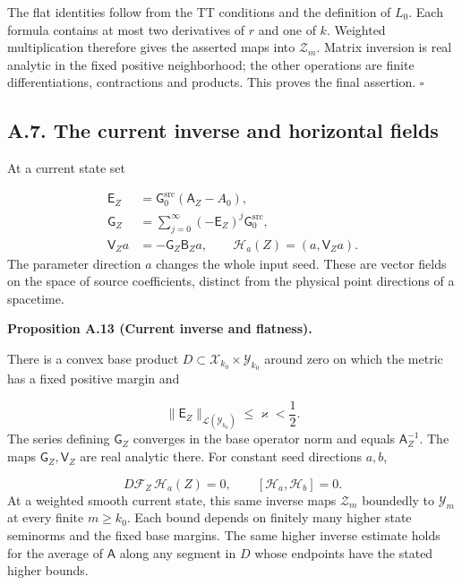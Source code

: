 \documentclass[
  english,
  11pt,
  reqno]{amsart}
\makeatletter
\newcommand{\pandocstatementheading}[1]{%
  \par\addpenalty{\@beginparpenalty}%
  \addvspace{.5\baselineskip plus .2\baselineskip minus .2\baselineskip}%
  {\normalfont\bfseries #1\par}%
  \nobreak\@afterindenttrue\@afterheading
}
\makeatother
\begin{document}
The flat identities follow from the TT conditions and the definition of
\(L_0\). Each formula contains at most two derivatives of \(r\) and one
of \(k\). Weighted multiplication therefore gives the asserted maps into
\(\mathcal Z_m\). Matrix inversion is real analytic in the fixed
positive neighborhood; the other operations are finite differentiations,
contractions and products. This proves the final assertion.
\hfill\(\square\)

\subsection{A.7. The current inverse and horizontal
fields}\label{a.7.-the-current-inverse-and-horizontal-fields}\label{sec:online-current-inverse-and-flatness}

At a current state set

\label{eq:online-current-horizontal-fields} \[
\begin{aligned}
\mathsf E_Z&=\mathsf G_0^{\mathrm{src}}(\mathsf A_Z-A_0),\\
\mathsf G_Z&=\sum_{j=0}^{\infty}(-\mathsf E_Z)^j\mathsf G_0^{\mathrm{src}},\\
\mathsf V_Za&=-\mathsf G_Z\mathsf B_Za,\qquad
\mathscr H_a(Z)=(a,\mathsf V_Za).
\end{aligned}
\] The parameter direction \(a\) changes the whole input seed. These are
vector fields on the space of source coefficients, distinct from the
physical point directions of a spacetime.

\pandocstatementheading{\leavevmode{}\label{prop:online-current-inverse-horizontal-flatness}Proposition A.13 (Current inverse and flatness).}

There is a convex base product
\(D\subset\mathcal X_{k_0}\times\mathcal Y_{k_0}\) around zero on which
the metric has a fixed positive margin and

\label{eq:online-current-fixed-inverse-margin} \[
\|\mathsf E_Z\|_{\mathcal L(\mathcal Y_{k_0})}
\le\varkappa<\frac12.
\] The series defining \(\mathsf G_Z\) converges in the base operator
norm and equals \(\mathsf A_Z^{-1}\). The maps
\(\mathsf G_Z,\mathsf V_Z\) are real analytic there. For constant seed
directions \(a,b\),

\label{eq:online-current-horizontal-conservation-and-flatness}
\[
D\mathcal F_Z\,\mathscr H_a(Z)=0,\qquad
[\mathscr H_a,\mathscr H_b]=0.
\] At a weighted smooth current state, this same inverse maps
\(\mathcal Z_m\) boundedly to \(\mathcal Y_m\) at every finite
\(m\ge k_0\). Each bound depends on finitely many higher state seminorms
and the fixed base margins. The same higher inverse estimate holds for
the average of \(\mathsf A\) along any segment in \(D\) whose endpoints
have the stated higher bounds.
\end{document}
